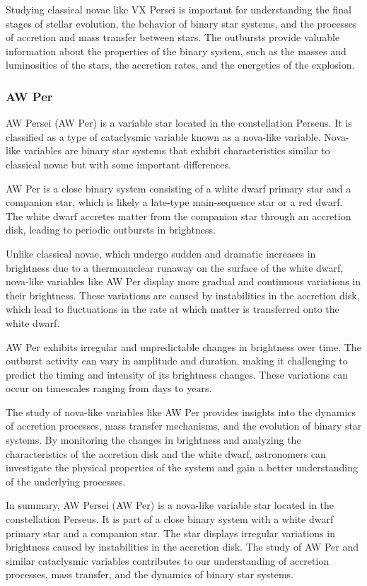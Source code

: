 Studying classical novae like VX Persei is important for understanding the final stages of stellar evolution, the behavior of binary star systems, and the processes of accretion and mass transfer between stars. The outbursts provide valuable information about the properties of the binary system, such as the masses and luminosities of the stars, the accretion rates, and the energetics of the explosion.


\subsubsection*{ AW Per }
AW Persei (AW Per) is a variable star located in the constellation Perseus. It is classified as a type of cataclysmic variable known as a nova-like variable. Nova-like variables are binary star systems that exhibit characteristics similar to classical novae but with some important differences.

AW Per is a close binary system consisting of a white dwarf primary star and a companion star, which is likely a late-type main-sequence star or a red dwarf. The white dwarf accretes matter from the companion star through an accretion disk, leading to periodic outbursts in brightness.

Unlike classical novae, which undergo sudden and dramatic increases in brightness due to a thermonuclear runaway on the surface of the white dwarf, nova-like variables like AW Per display more gradual and continuous variations in their brightness. These variations are caused by instabilities in the accretion disk, which lead to fluctuations in the rate at which matter is transferred onto the white dwarf.

AW Per exhibits irregular and unpredictable changes in brightness over time. The outburst activity can vary in amplitude and duration, making it challenging to predict the timing and intensity of its brightness changes. These variations can occur on timescales ranging from days to years.

The study of nova-like variables like AW Per provides insights into the dynamics of accretion processes, mass transfer mechanisms, and the evolution of binary star systems. By monitoring the changes in brightness and analyzing the characteristics of the accretion disk and the white dwarf, astronomers can investigate the physical properties of the system and gain a better understanding of the underlying processes.

In summary, AW Persei (AW Per) is a nova-like variable star located in the constellation Perseus. It is part of a close binary system with a white dwarf primary star and a companion star. The star displays irregular variations in brightness caused by instabilities in the accretion disk. The study of AW Per and similar cataclysmic variables contributes to our understanding of accretion processes, mass transfer, and the dynamics of binary star systems.

